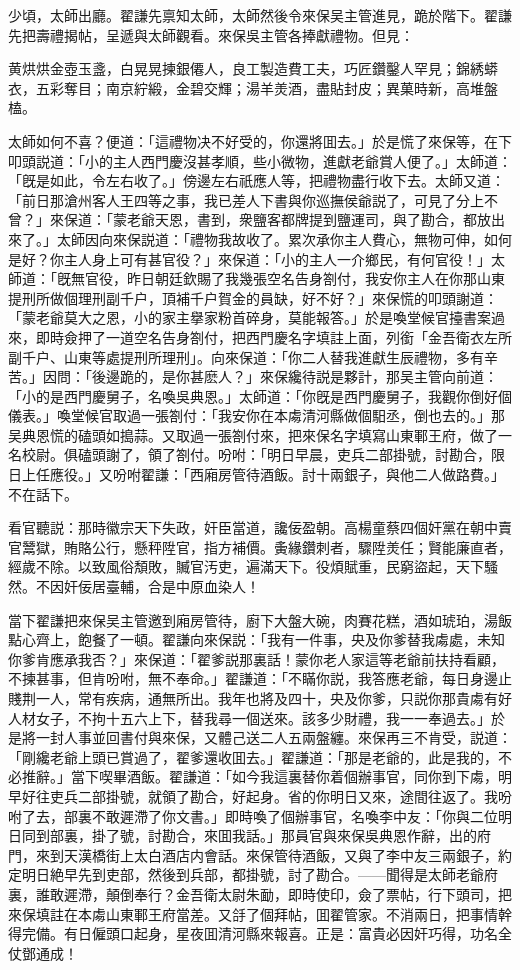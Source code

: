 少頃，太師出廳。翟謙先禀知太師，太師然後令來保吴主管進見，跪於階下。翟謙先把壽禮揭帖，呈遞與太師觀看。來保吳主管各捧獻禮物。但見：

黄烘烘金壺玉盞，白晃晃揀銀僊人，良工製造費工夫，巧匠鑽鑿人罕見；錦綉蟒衣，五彩奪目；南京紵緞，金碧交輝；湯羊羙酒，盡貼封皮；異菓時新，高堆盤榼。

太師如何不喜？便道：「這禮物决不好受的，你還將囬去。」於是慌了來保等，在下叩頭説道：「小的主人西門慶沒甚孝順，些小微物，進獻老爺賞人便了。」太師道：「旣是如此，令左右收了。」傍邊左右祇應人等，把禮物盡行收下去。太師又道：「前日那滄州客人王四等之事，我已差人下書與你巡撫侯爺説了，可見了分上不曾？」來保道：「蒙老爺天恩，書到，衆鹽客都牌提到鹽運司，與了勘合，都放出來了。」太師因向來保説道：「禮物我故收了。累次承你主人費心，無物可伸，如何是好？你主人身上可有甚官役？」來保道：「小的主人一介鄉民，有何官役！」太師道：「旣無官役，昨日朝廷欽賜了我幾張空名告身劄付，我安你主人在你那山東提刑所做個理刑副千户，頂補千户賀金的員缺，好不好？」來保慌的叩頭謝道：「蒙老爺莫大之恩，小的家主擧家粉首碎身，莫能報答。」於是喚堂候官擡書案過來，即時僉押了一道空名告身劄付，把西門慶名字填註上面，列銜「金吾衛衣左所副千户、山東等處提刑所理刑」。向來保道：「你二人替我進獻生辰禮物，多有辛苦。」因問：「後邊跪的，是你甚麽人？」來保纔待説是夥計，那吴主管向前道：「小的是西門慶舅子，名喚吳典恩。」太師道：「你旣是西門慶舅子，我觀你倒好個儀表。」喚堂候官取過一張劄付：「我安你在本䖏清河縣做個馹丞，倒也去的。」那吴典恩慌的磕頭如搗蒜。又取過一張劄付來，把來保名字填寫山東鄆王府，做了一名校尉。俱磕頭謝了，領了劄付。吩咐：「明日早晨，吏兵二部掛號，討勘合，限日上任應役。」又吩咐翟謙：「西廂房管待酒飯。討十兩銀子，與他二人做路費。」不在話下。

看官聽説：那時徽宗天下失政，奸臣當道，讒佞盈朝。高楊童蔡四個奸黨在朝中賣官鬵獄，賄賂公行，懸秤陞官，指方補價。夤緣鑽刺者，驟陞羙任；賢能廉直者，經歲不除。以致風俗頽敗，贓官汚吏，遍滿天下。役煩賦重，民窮盜起，天下騷然。不因奸佞居臺輔，合是中原血染人！

當下翟謙把來保吴主管邀到廂房管待，廚下大盤大碗，肉賽花糕，酒如琥珀，湯飯點心齊上，飽餐了一頓。翟謙向來保説：「我有一件事，央及你爹替我䖏處，未知你爹肯應承我否？」來保道：「翟爹説那裏話！蒙你老人家這等老爺前扶持看顧，不揀甚事，但肯吩咐，無不奉命。」翟謙道：「不瞞你説，我答應老爺，每日身邊止賤荆一人，常有疾病，通無所出。我年也將及四十，央及你爹，只説你那貴䖏有好人材女子，不拘十五六上下，替我尋一個送來。該多少財禮，我一一奉過去。」於是將一封人事並回書付與來保，又體己送二人五兩盤纏。來保再三不肯受，説道：「剛纔老爺上頭已賞過了，翟爹還收囬去。」翟謙道：「那是老爺的，此是我的，不必推辭。」當下喫畢酒飯。翟謙道：「如今我這裏替你着個辦事官，同你到下䖏，明早好往吏兵二部掛號，就領了勘合，好起身。省的你明日又來，途間往返了。我吩咐了去，部裏不敢遲滯了你文書。」即時喚了個辦事官，名喚李中友：「你與二位明日同到部裏，掛了號，討勘合，來囬我話。」那員官與來保吳典恩作辭，出的府門，來到天漢橋街上太白酒店内會話。來保管待酒飯，又與了李中友三兩銀子，約定明日絶早先到吏部，然後到兵部，都掛號，討了勘合。——聞得是太師老爺府裏，誰敢遲滯，顛倒奉行？金吾衛太尉朱勔，即時使印，僉了票帖，行下頭司，把來保填註在本䖏山東鄆王府當差。又㧱了個拜帖，囬翟管家。不消兩日，把事情幹得完備。有日僱頭口起身，星夜囬清河縣來報喜。正是：富貴必因奸巧得，功名全仗鄧通成！

